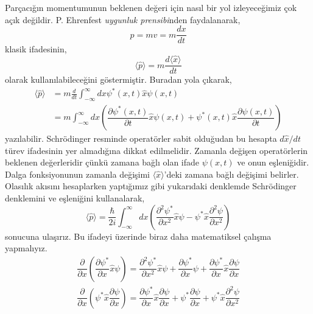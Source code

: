 \documentclass[a4paper,12pt, twoside]{article}
\begin{document}
Parçacığın momentumunun beklenen değeri için nasıl bir yol izleyeceğimiz çok açık değildir. P. Ehrenfest \emph{uygunluk prensibi}nden faydalanarak,
\begin{equation*}
p = m v = m\frac{dx}{dt}
\end{equation*}
klasik ifadesinin,
\begin{equation*}
\langle \hat p \rangle = m\frac{d \langle \hat x \rangle}{dt}
\end{equation*}
olarak kullanılabileceğini göstermiştir. Buradan yola çıkarak,
\begin{align}
\langle \hat p \rangle &= m \frac{d}{dt} \int ^{\infty }_{-\infty }dx \psi^{\ast }\left(x,t\right) \hat x \psi \left( x,t\right)\\
&=m\int ^{\infty }_{-\infty }dx\left( \dfrac {\partial \psi ^{\ast }\left( x,t\right) }{\partial t} \hat x\psi \left( x,t\right) +\psi ^{\ast }\left( x,t\right) \hat x \dfrac {\partial \psi \left( x,t\right) }{\partial t}\right) \nonumber 
\end{align}
yazılabilir. Schrödinger resminde operatörler sabit olduğudan bu hesapta $d \hat x/dt$ türev ifadesinin yer almadığına dikkat edilmelidir. Zamanla değişen operatörlerin beklenen değerleridir çünkü zamana bağlı olan ifade $\psi(x,t)$ ve onun eşleniğidir. Dalga fonksiyonunun zamanla değişimi $\langle \hat x \rangle$'deki zamana bağlı değişimi belirler. Olasılık akısını hesaplarken yaptığımız gibi yukarıdaki denklemde Schrödinger denklemini ve eşleniğini kullanalarak,
\begin{equation}
\langle \hat p\rangle =\dfrac {\hbar }{2i}\int ^{\infty }_{-\infty }dx\left( \dfrac {\partial ^{2}\psi ^{\ast }}{\partial x^{2}}\hat x\psi -\psi ^{\ast } \hat x\dfrac {\partial ^{2}\psi }{\partial x^{2}}\right)
\label{eq:expectation_val_p_1}
\end{equation}
sonucuna ulaşırız. Bu ifadeyi üzerinde biraz daha matematiksel çalışma yapmalıyız.
\begin{align*}
\dfrac {\partial }{\partial x}\left( \dfrac {\partial \psi ^{\ast }}{\partial x} \hat x\psi \right) =\dfrac {\partial ^{2}\psi^{\ast }}{\partial x^{2}}\hat x\psi +\dfrac {\partial \psi ^{\ast }}{\partial x}\psi +\dfrac {\partial \psi ^{\ast }}{\partial x}\hat x\dfrac {\partial \psi }{\partial x} \\
\dfrac {\partial }{\partial x}\left( \psi ^{\ast }\hat x\dfrac {\partial \psi }{\partial x}\right) =\dfrac {\partial \psi ^{\ast }}{\partial x}\hat x\dfrac {\partial \psi }{\partial x}+\psi ^{\ast }\dfrac {\partial \psi }{\partial x} + \psi ^{\ast } \hat x \dfrac {\partial ^{2}\psi }{\partial x^{2}}
\end{align*}
\end{document}
